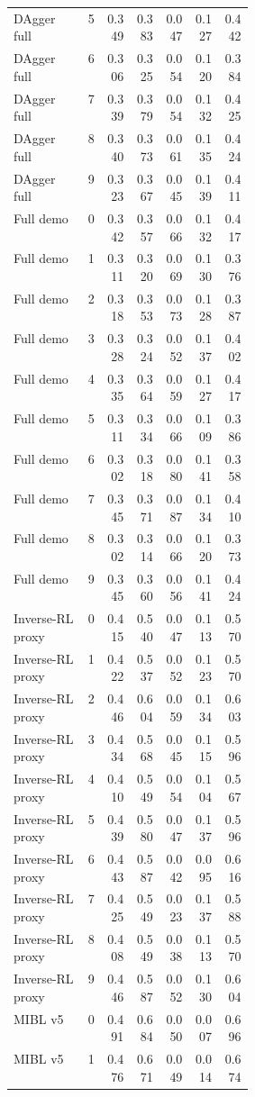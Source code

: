 \documentclass{article}
\begin{document}
\begin{center}
\begin{longtable}{p{0.31\linewidth}rrrrrr}
DAgger full & 5 & 0.349 & 0.383 & 0.047 & 0.127 & 0.442\\
DAgger full & 6 & 0.306 & 0.325 & 0.054 & 0.120 & 0.384\\
DAgger full & 7 & 0.339 & 0.379 & 0.054 & 0.132 & 0.425\\
DAgger full & 8 & 0.340 & 0.373 & 0.061 & 0.135 & 0.424\\
DAgger full & 9 & 0.323 & 0.367 & 0.045 & 0.139 & 0.411\\
Full demo & 0 & 0.342 & 0.357 & 0.066 & 0.132 & 0.417\\
Full demo & 1 & 0.311 & 0.320 & 0.069 & 0.130 & 0.376\\
Full demo & 2 & 0.318 & 0.353 & 0.073 & 0.128 & 0.387\\
Full demo & 3 & 0.328 & 0.324 & 0.052 & 0.137 & 0.402\\
Full demo & 4 & 0.335 & 0.364 & 0.059 & 0.127 & 0.417\\
Full demo & 5 & 0.311 & 0.334 & 0.066 & 0.109 & 0.386\\
Full demo & 6 & 0.302 & 0.318 & 0.080 & 0.141 & 0.358\\
Full demo & 7 & 0.345 & 0.371 & 0.087 & 0.134 & 0.410\\
Full demo & 8 & 0.302 & 0.314 & 0.066 & 0.120 & 0.373\\
Full demo & 9 & 0.345 & 0.360 & 0.056 & 0.141 & 0.424\\
Inverse-RL proxy & 0 & 0.415 & 0.540 & 0.047 & 0.113 & 0.570\\
Inverse-RL proxy & 1 & 0.422 & 0.537 & 0.052 & 0.123 & 0.570\\
Inverse-RL proxy & 2 & 0.446 & 0.604 & 0.059 & 0.134 & 0.603\\
Inverse-RL proxy & 3 & 0.434 & 0.568 & 0.045 & 0.115 & 0.596\\
Inverse-RL proxy & 4 & 0.410 & 0.549 & 0.054 & 0.104 & 0.567\\
Inverse-RL proxy & 5 & 0.439 & 0.580 & 0.047 & 0.137 & 0.596\\
Inverse-RL proxy & 6 & 0.443 & 0.587 & 0.042 & 0.095 & 0.616\\
Inverse-RL proxy & 7 & 0.425 & 0.549 & 0.023 & 0.137 & 0.588\\
Inverse-RL proxy & 8 & 0.408 & 0.549 & 0.038 & 0.113 & 0.570\\
Inverse-RL proxy & 9 & 0.446 & 0.587 & 0.052 & 0.130 & 0.604\\
MIBL v5 & 0 & 0.491 & 0.684 & 0.050 & 0.007 & 0.696\\
MIBL v5 & 1 & 0.476 & 0.671 & 0.049 & 0.014 & 0.674\\

\end{longtable}
\end{center}
\end{document}
